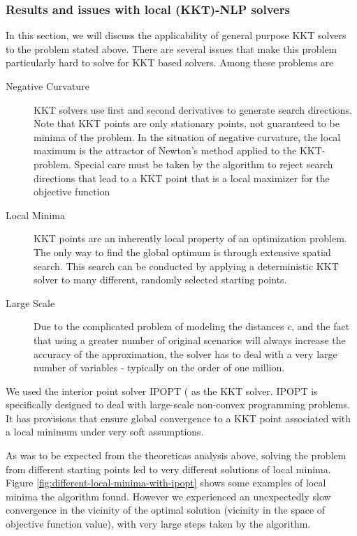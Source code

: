 \documentclass[a4paper, 12pt] {article}
\begin{document}
\subsubsection{Results and issues with local (KKT)-NLP solvers}
In this section, we will discuss the applicability of general purpose KKT solvers to the problem stated above. There are several issues that make this problem particularly hard to solve for KKT based solvers. Among these problems are
\begin{description}
\item[Negative Curvature] KKT solvers use first and second derivatives to generate search directions. Note that KKT points are only stationary points, not guaranteed to be minima of the problem. In the situation of negative curvature, the local maximum is the attractor of Newton's method applied to the KKT-problem. Special care must be taken by the algorithm to reject search directions that lead to a KKT point that is a local maximizer for the objective function
\item[Local Minima] KKT points are an inherently local property of an optimization problem. The only way to find the global optimum is through extensive spatial search. This search can be conducted by applying a deterministic KKT solver to many different, randomly selected starting points.
\item[Large Scale] Due to the complicated problem of modeling the distances $c$, and the fact that using a greater number of original scenarios will always increase the accuracy of the approximation, the solver has to deal with a very large number of variables - typically on the order of one million.
\end{description}
We used the interior point solver IPOPT (\cite{IpoptImplementation2006} as the KKT solver. IPOPT is specifically designed to deal with large-scale non-convex programming problems. It has provisions that ensure global convergence to a KKT point associated with a local minimum under very soft assumptions.

As was to be expected from the theoreticas analysis above, solving the problem from different starting points led to very different solutions of local minima. Figure \ref{fig:different-local-minima-with-ipopt} shows some examples of local minima the algorithm found. However we experienced an unexpectedly slow convergence in the vicinity of the optimal solution (vicinity in the space of objective function value), with very large steps taken by the algorithm. 
\end{document}
